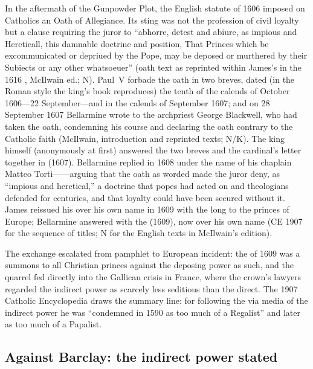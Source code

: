 In the aftermath of the Gunpowder Plot, the English statute of
1606 imposed on Catholics an Oath of Allegiance. Its sting was not
the profession of civil loyalty but a clause requiring the juror
to ``abhorre, detest and abiure, as impious and Hereticall, this
damnable doctrine and position, That Princes which be
excommunicated or depriued by the Pope, may be deposed or
murthered by their Subiects or any other whatsoeuer'' (oath text
as reprinted within James's 
in the 1616 , McIlwain ed.; N). Paul~V forbade the
oath in two breves, dated (in the Roman style the king's book
reproduces) the tenth of the calends of October 1606---22
September---and in the calends of September 1607; and on 28
September 1607 Bellarmine wrote to the archpriest George
Blackwell, who had taken the oath, condemning his course and
declaring the oath contrary to the Catholic faith (McIlwain,
introduction and reprinted texts; N/K). The king himself
(anonymously at first) answered the two breves and the cardinal's
letter together in  (1607). Bellarmine replied in 1608 under the
name of his chaplain Matteo Torti------arguing that the oath as worded made the juror deny, as
``impious and heretical,'' a doctrine that popes had acted on and
theologians defended for centuries, and that loyalty could have
been secured without it. James reissued his  over
his own name in 1609 with the long  to the
princes of Europe; Bellarmine answered with the  (1609), now over his own name (CE 1907 for
the sequence of titles; N for the English texts in McIlwain's
edition).

The exchange escalated from pamphlet to European incident: the
 of 1609 was a summons to all Christian princes
against the deposing power as such, and the quarrel fed directly
into the Gallican crisis in France, where the crown's lawyers
regarded the indirect power as scarcely less seditious than the
direct. The 1907 Catholic Encyclopedia draws the summary line: for
following the via media of the indirect power he was ``condemned
in 1590 as too much of a Regalist'' and later as too much of a
Papalist.

\subsection{Against Barclay: the indirect power stated}

